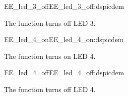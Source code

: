 \begin{function_nopb2}{EE\_led\_3\_off}{EE_led_3_off:dspicdem}
  
  \begin{fundescription}
    The function turns off LED 3.
  \end{fundescription}
  
  
  
\end{function_nopb2}

\begin{function_nopb2}{EE\_led\_4\_on}{EE_led_4_on:dspicdem}
  
  \begin{fundescription}
    The function turns on LED 4.
  \end{fundescription}
  
  
  
\end{function_nopb2}

\begin{function_nopb2}{EE\_led\_4\_off}{EE_led_4_off:dspicdem}
  
  \begin{fundescription}
    The function turns off LED 4.
  \end{fundescription}
  
  
  
\end{function_nopb2}


